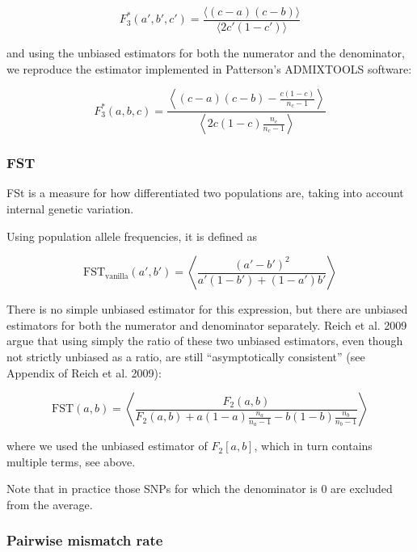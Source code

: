 \documentclass{article}
\begin{document}
\begin{equation}
F_3^*(a',b',c')=\frac{\langle (c-a)(c-b)\rangle}{\langle 2 c'(1-c' )\rangle}
\end{equation}

and using the unbiased estimators for both the numerator and the denominator, we reproduce the estimator implemented in Patterson{'}s ADMIXTOOLS
software:

\begin{equation}
F_3^*(a,b,c)=\frac{\left\langle (c-a)(c-b)-\frac{c(1-c)}{n_c-1}\right\rangle}{\left\langle 2 c(1-c )\frac{n_c}{n_c-1}\right\rangle}
\end{equation}

\subsubsection{FST}

FSt is a measure for how differentiated two populations are, taking into account internal genetic variation. 

Using population allele frequencies, it is defined as

\begin{equation}
\text{FST}_\text{vanilla}\left(a',b'\right)=\left\langle\frac{\left(a'-b'\right)^2}{a' \left(1-b'\right)+\left(1-a'\right) b'}\right\rangle
\end{equation}

There is no simple unbiased estimator for this expression, but there are unbiased estimators for both the numerator and denominator separately. Reich et al. 2009 argue that using simply the ratio of these two unbiased estimators, even though not strictly unbiased as a ratio, are still {``}asymptotically consistent{''} (see Appendix of Reich et al. 2009):

\begin{equation}
\text{FST}(a,b)=\left\langle \frac{F_2(a,b)}{F_2(a,b)+a(1-a) \frac{n_a}{n_a-1}-b(1-b) \frac{n_b}{n_b-1}}\right\rangle
\end{equation}

where we used the unbiased estimator of \(F_2[a,b]\), which in turn contains multiple terms, see above.

Note that in practice those SNPs for which the denominator is 0 are excluded from the average.

\subsubsection{Pairwise mismatch rate}
\end{document}
